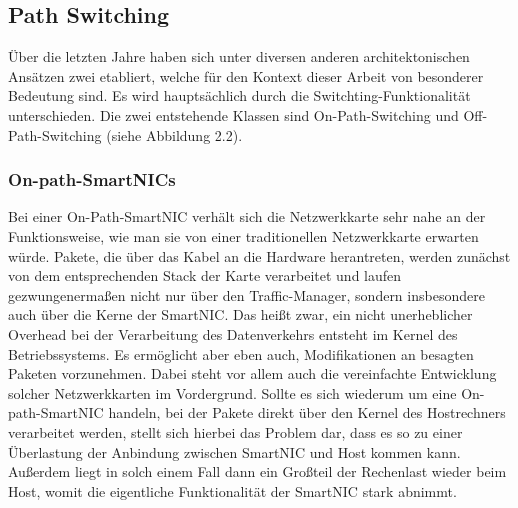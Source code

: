\subsection{Path Switching}
Über die letzten Jahre haben sich unter diversen anderen architektonischen Ansätzen zwei etabliert, welche für den Kontext dieser Arbeit von besonderer Bedeutung sind. Es wird hauptsächlich durch die Switchting-Funktionalität unterschieden. Die zwei entstehende Klassen sind On-Path-Switching und Off-Path-Switching (siehe Abbildung 2.2).
\subsubsection{On-path-SmartNICs}
Bei einer On-Path-SmartNIC verhält sich die Netzwerkkarte sehr nahe an der Funktionsweise, wie man sie von einer traditionellen Netzwerkkarte erwarten würde. Pakete, die über das Kabel an die Hardware herantreten, werden zunächst von dem entsprechenden Stack der Karte verarbeitet und laufen gezwungenermaßen nicht nur über den Traffic-Manager, sondern insbesondere auch über die Kerne der SmartNIC. \cite{onoffpath} Das heißt zwar, ein nicht unerheblicher Overhead bei der Verarbeitung des Datenverkehrs entsteht im Kernel des Betriebssystems. Es ermöglicht aber eben auch, Modifikationen an besagten Paketen vorzunehmen. Dabei steht vor allem auch die vereinfachte Entwicklung solcher Netzwerkkarten im Vordergrund. Sollte es sich wiederum um eine On-path-SmartNIC handeln, bei der Pakete direkt über den Kernel des Hostrechners verarbeitet werden, stellt sich hierbei das Problem dar, dass es so zu einer Überlastung der Anbindung zwischen SmartNIC und Host kommen kann. Außerdem liegt in solch einem Fall dann ein Großteil der Rechenlast wieder beim Host, womit die eigentliche Funktionalität der SmartNIC stark abnimmt. 
